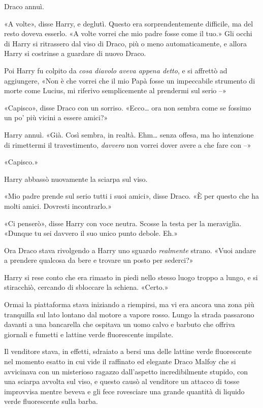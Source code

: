 Draco annuì.

«A volte», disse Harry, e deglutì. Questo era sorprendentemente difficile, ma del resto doveva esserlo. «A volte vorrei che mio padre fosse come il tuo.» Gli occhi di Harry si ritrassero dal viso di Draco, più o meno automaticamente, e allora Harry si costrinse a guardare di nuovo Draco.

Poi Harry fu colpito da \textit{cosa diavolo aveva appena detto}, e si affrettò ad aggiungere, «Non è che vorrei che il mio Papà fosse un impeccabile strumento di morte come Lucius, mi riferivo semplicemente al prendermi sul serio –»

«Capisco», disse Draco con un sorriso. «Ecco… ora non sembra come se fossimo un po’ più vicini a essere amici?»

Harry annuì. «Già. Così sembra, in realtà. Ehm… senza offesa, ma ho intenzione di rimettermi il travestimento, \textit{davvero} non vorrei dover avere a che fare con –»

«Capisco.»

Harry abbassò nuovamente la sciarpa sul viso.

«Mio padre prende sul serio tutti i suoi amici», disse Draco. «È per questo che ha molti amici. Dovresti incontrarlo.»

«Ci penserò», disse Harry con voce neutra. Scosse la testa per la meraviglia. «Dunque tu sei davvero il suo unico punto debole. Eh.»

Ora Draco stava rivolgendo a Harry uno sguardo \textit{realmente} strano. «Vuoi andare a prendere qualcosa da bere e trovare un posto per sederci?»

Harry si rese conto che era rimasto in piedi nello stesso luogo troppo a lungo, e si stiracchiò, cercando di sbloccare la schiena. «Certo.»

Ormai la piattaforma stava iniziando a riempirsi, ma vi era ancora una zona più tranquilla sul lato lontano dal motore a vapore rosso. Lungo la strada passarono davanti a una bancarella che ospitava un uomo calvo e barbuto che offriva giornali e fumetti e lattine verde fluorescente impilate.

Il venditore stava, in effetti, sdraiato a bersi una delle lattine verde fluorescente nel momento esatto in cui vide il raffinato ed elegante Draco Malfoy che si avvicinava con un misterioso ragazzo dall’aspetto incredibilmente stupido, con una sciarpa avvolta sul viso, e questo causò al venditore un attacco di tosse improvvisa mentre beveva e gli fece rovesciare una grande quantità di liquido verde fluorescente sulla barba.

